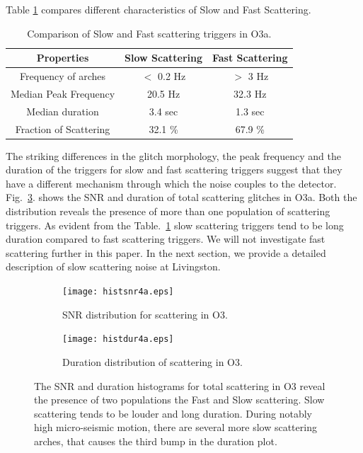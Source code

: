 \documentclass[12pt]{iopart}
\begin{document}
Table \ref{tab:fastslowtab} compares different characteristics of Slow and Fast Scattering.
\begin{table}[h]
    \centering
    \begin{tabular}{c|c|c}
    \hline
      \textbf{Properties}   &  \textbf{Slow Scattering} & 
      \textbf{Fast Scattering}\\
      \hline
       Frequency of arches  & $<$ 0.2 Hz & $>$ 3 Hz \\
      \hline
      Median Peak Frequency & 20.5 Hz & 32.3 Hz \\
      \hline
      Median duration & 3.4 sec & 1.3 sec \\
      \hline
      Fraction of Scattering & 32.1 \% & 67.9 \% \\
       
    \hline
    \end{tabular}
    \caption{Comparison of Slow and Fast scattering triggers in O3a.}
    \label{tab:fastslowtab}
\end{table}{}


The striking differences in the glitch morphology, the peak frequency and the duration of the triggers for slow and fast scattering triggers suggest that they have a different mechanism through which the noise couples to the detector. Fig.~\ref{fig:snrdur}. shows the SNR and duration of total scattering glitches in O3a. Both the distribution reveals the presence of more than one population of scattering triggers. As evident from the Table.~\ref{tab:fastslowtab} slow scattering triggers tend to be long duration compared to fast scattering triggers. We will not investigate fast scattering further in this paper. In the next section, we provide a detailed description of slow scattering noise at Livingston.
\begin{figure}[h]
   \centering
    \begin{subfigure}[b]{0.45\textwidth}
        \centering
         \texttt{[image: histsnr4a.eps]}
         \caption{SNR distribution for scattering in O3.}
         \label{fig:histsnr}
    \end{subfigure}
    \hfill
    \begin{subfigure}[b]{0.5\textwidth}
        \centering
         \texttt{[image: histdur4a.eps]}
         \caption{{\small Duration distribution of scattering in O3.}}
         \label{fig:histdur}
         
    
    \end{subfigure}
    \caption{The SNR and duration histograms for total scattering in O3 reveal the presence of two populations the Fast and Slow scattering. Slow scattering tends to be louder and long duration. During notably high micro-seismic motion, there are several more slow scattering arches, that causes the third bump in the duration plot.}
    \label{fig:snrdur}
    
\end{figure}
\end{document}
